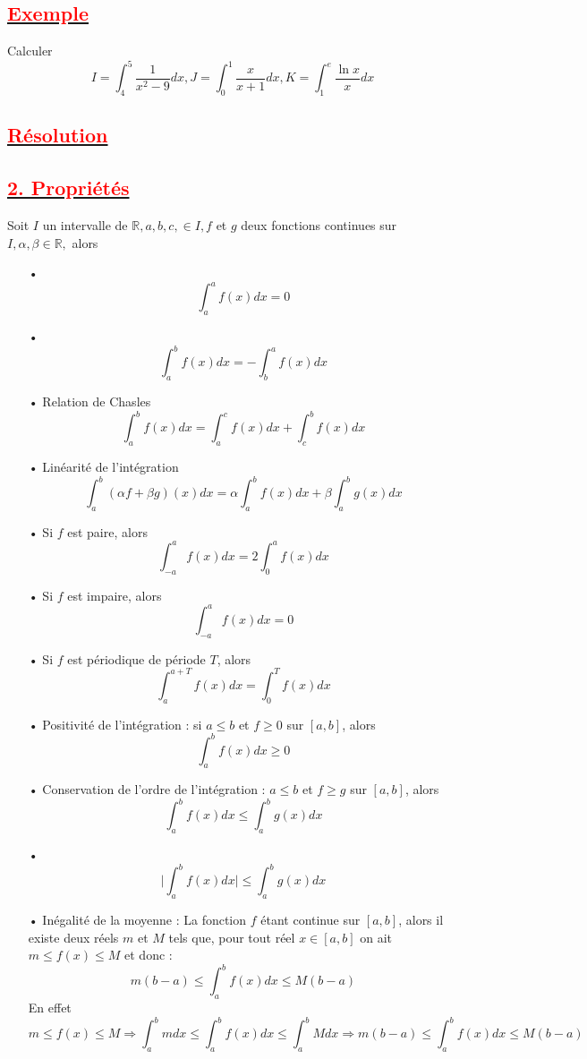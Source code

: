 \documentclass[12pt]{article}
\begin{document}
\subsection*{\underline{\textbf{\textcolor{red}{Exemple  }}}}
Calculer
\[I=\int_{4}^{5}\frac{1}{x^{2}-9}dx , J=\int_{0}^{1}\frac{x}{x+1}dx, K=\int_{1}^{e}\frac{\ln x}{x}dx\]
\subsection*{\underline{\textbf{\textcolor{red}{Résolution }}}}
\subsection*{\underline{\textbf{\textcolor{red}{2. Propriétés }}}}
Soit $I$ un intervalle de $\mathbb{R}, a, b, c, \in I, f$ et $g$ deux fonctions continues sur $I, \alpha, \beta \in \mathbb{R},$ alors
\begin{itemize}
\item[•] \[\int_{a}^{a}f(x)dx=0\]
\item[•] \[\int_{a}^{b}f(x)dx=-\int_{b}^{a}f(x)dx\]
\item[•] Relation de Chasles \[\int_{a}^{b}f(x)dx=\int_{a}^{c}f(x)dx+\int_{c}^{b}f(x)dx\]
\item[•] Linéarité de l'intégration \[\int_{a}^{b}(\alpha f+\beta g)(x)dx=
\alpha \int_{a}^{b}f(x)dx+\beta\int_{a}^{b}g(x)dx \]
\item[•] Si $f$ est paire, alors \[\int_{-a}^{a}f(x)dx=2\int_{0}^{a}f(x)dx \]
\item[•] Si $f$ est impaire, alors \[\int_{-a}^{a}f(x)dx=0\]
\item[•] Si $f$ est périodique de période $T$, alors
\[\int_{a}^{a+T}f(x)dx=\int_{0}^{T}f(x)dx\]
\item[•] Positivité de l'intégration : si $a\leq b$ et $f\geq 0$ sur $[a, b]$, alors
\[\int_{a}^{b}f(x)dx\geq 0\]
\item[•] Conservation de l'ordre de l'intégration : $a\leq b$ et $f\geq g$ sur $[a, b]$, alors \[\int_{a}^{b}f(x)dx\leq \int_{a}^{b}g(x)dx \]
\item[•] \[\mid\int_{a}^{b}f(x)dx\mid\leq \int_{a}^{b}g(x)dx \]
\item[•]  Inégalité de la moyenne : La fonction $f$ étant continue sur $[a, b]$, alors il existe deux réels $m$ et $M$ tels que, pour tout réel $x\in [a, b]$ on ait $m\leq f(x)\leq M$ et donc : \[m(b-a)\leq \int_{a}^{b}f(x)dx \leq M(b-a)\] 
En effet
\[m\leq f(x)\leq M \Longrightarrow \int_{a}^{b}mdx \leq \int_{a}^{b}f(x)dx \leq \int_{a}^{b}Mdx \Longrightarrow m(b-a)\leq \int_{a}^{b}f(x)dx \leq M(b-a)\]
\end{itemize}
\end{document}
